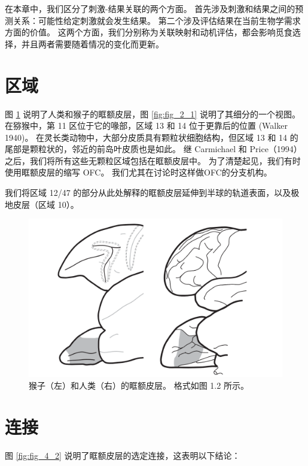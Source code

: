 在本章中，我们区分了刺激-结果关联的两个方面。
首先涉及刺激和结果之间的预测关系：可能性给定刺激就会发生结果。
第二个涉及评估结果在当前生物学需求方面的价值。
这两个方面，我们分别称为关联映射和动机评估，都会影响觅食选择，并且两者需要随着情况的变化而更新。\par



\section{区域}

图 \ref{fig:fig_4_1} 说明了人类和猴子的眶额皮层，图 \ref{fig:fig_2_1} 说明了其细分的一个视图。
在猕猴中，第 11 区位于它的喙部，区域 13 和 14 位于更靠后的位置 (Walker 1940)。
在灵长类动物中，大部分皮质具有颗粒状细胞结构，但区域 13 和 14 的尾部是颗粒状的，邻近的前岛叶皮质也是如此。
继 Carmichael 和 Price（1994）之后，我们将所有这些无颗粒区域包括在眶额皮层中。
为了清楚起见，我们有时使用眶额皮层的缩写 OFC。
我们尤其在讨论时这样做OFC的分支机构。\par


我们将区域 12/47 的部分从此处解释的眶额皮层延伸到半球的轨道表面，以及极地皮层（区域 10）。


\begin{figure}[!htb]
	\centering
	\includegraphics{image_pfc/Fig_4_1}
	\caption{猴子（左）和人类（右）的眶额皮层。 格式如图 1.2 所示。}\label{fig:fig_4_1}
\end{figure}



\section{连接}

图 \ref{fig:fig_4_2} 说明了眶额皮层的选定连接，这表明以下结论：\par


